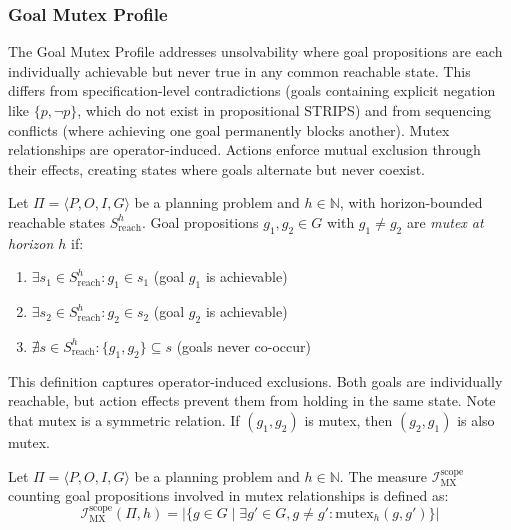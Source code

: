 \subsubsection{Goal Mutex Profile}
\label{sec:goal_mutex_profile}

The Goal Mutex Profile addresses unsolvability where goal propositions are each individually achievable but never true in any common reachable state. This differs from specification-level contradictions (goals containing explicit negation like $\{p, \neg p\}$, which do not exist in propositional \ac{STRIPS}) and from sequencing conflicts (where achieving one goal permanently blocks another). Mutex relationships are operator-induced. Actions enforce mutual exclusion through their effects, creating states where goals alternate but never coexist.

\begin{defn}
    \label{defn:mutex_goal_pair}
    Let $\Pi = \langle P, O, I, G \rangle$ be a planning problem and $h \in \mathbb{N}$, with horizon-bounded reachable states $S^h_{\text{reach}}$. Goal propositions $g_1, g_2 \in G$ with $g_1 \neq g_2$ are \emph{mutex at horizon $h$} if:
    \begin{enumerate}
        \item $\exists s_1 \in S^h_{\text{reach}} : g_1 \in s_1$ (goal $g_1$ is achievable)
        \item $\exists s_2 \in S^h_{\text{reach}} : g_2 \in s_2$ (goal $g_2$ is achievable)
        \item $\nexists s \in S^h_{\text{reach}} : \{g_1, g_2\} \subseteq s$ (goals never co-occur)
    \end{enumerate}
\end{defn}

This definition captures operator-induced exclusions. Both goals are individually reachable, but action effects prevent them from holding in the same state. Note that mutex is a symmetric relation. If $(g_1, g_2)$ is mutex, then $(g_2, g_1)$ is also mutex.

\begin{defn}
    Let $\Pi = \langle P, O, I, G \rangle$ be a planning problem and $h \in \mathbb{N}$. The measure $\mathcal{I}^{\text{scope}}_{\text{MX}}$ counting goal propositions involved in mutex relationships is defined as:
    \begin{equation*}
        \mathcal{I}^{\text{scope}}_{\text{MX}}(\Pi, h) = |\{g \in G \mid \exists g' \in G, g \neq g' : \text{mutex}_h(g, g')\}|
    \end{equation*}
\end{defn}

